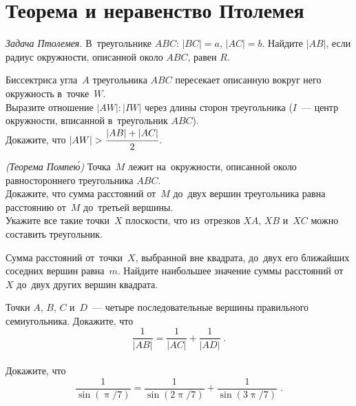 
\section*{Теорема и неравенство Птолемея}


\begingroup
    \def\abs#1{\lvert #1 \rvert}
    \ifdefined\mathup
        \def\piconst{\mathrm{\pi}}%
    \else
        \def\piconst{\uppi}%
    \fi

\begin{problems}

\item\emph{Задача Птолемея.}
В~треугольнике $ABC$: $\abs{BC} = a$, $\abs{AC} = b$.
Найдите $\abs{AB}$, если радиус окружности, описанной около $ABC$, равен $R$.

\item
Биссектриса угла~$A$ треугольника $ABC$ пересекает описанную вокруг него
окружность в~точке~$W$.
\\
\subproblem
Выразите отношение $\abs{AW} : \abs{IW}$ через длины сторон
треугольника ($I$~--- центр окружности, вписанной в~треугольник $ABC$).
\\[0.5ex]
\subproblem
Докажите, что
\(
    \abs{AW}
>
    \cfrac{\abs{AB} + \abs{AC}}{2}
\).


\item\emph{(Теорема Помпе\'{ю})}
Точка~$M$ лежит на~окружности, описанной около равностороннего
треугольника $ABC$.
\\
\subproblem
Докажите, что сумма расстояний от~$M$ до~двух вершин треугольника равна
расстоянию от~$M$ до~третьей вершины.
\\
\subproblem
Укажите все такие точки~$X$ плоскости, что из~отрезков $XA$, $XB$ и~$XC$ можно
составить треугольник.

\item
Сумма расстояний от~точки~$X$, выбранной вне квадрата, до~двух его ближайших
соседних вершин равна~$m$.
Найдите наибольшее значение суммы расстояний от~$X$ до~двух других вершин
квадрата.

\item
\subproblem
Точки $A$, $B$, $C$ и~$D$~--- четыре последовательные вершины правильного
семиугольника.
Докажите, что
\[
    \frac{1}{\abs{AB}}
=
    \frac{1}{\abs{AC}} + \frac{1}{\abs{AD}}
\; . \]
\\
\subproblem
Докажите, что
\[
    \frac{1}{\sin (\piconst / 7)}
=
    \frac{1}{\sin (2 \piconst / 7)}
    +
    \frac{1}{\sin (3 \piconst / 7)}
\; . \]


\end{problems}

